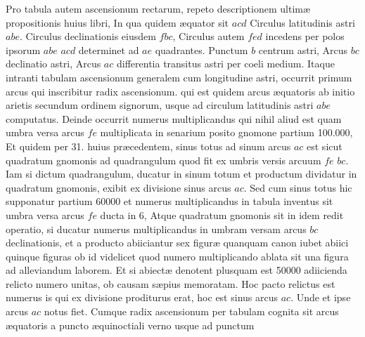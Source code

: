 \documentclass[11pt,a4paper]{article}
\begin{document}
Pro tabula autem ascensionum rectarum, repeto descriptionem
ultimæ propositionis huius libri, In qua quidem æquator sit $acd$
Circulus latitudinis astri $abe$. Circulus declinationis eiusdem
$fbc$, Circulus autem $fed$ incedens per polos ipsorum $abe$ $acd$
determinet ad $ae$ quadrantes. Punctum $b$ centrum astri,
Arcus $bc$ declinatio astri, Arcus $ac$ differentia transitus astri per
coeli medium. Itaque intranti tabulam ascensionum generalem
cum longitudine astri, occurrit primum arcus qui inscribitur
radix ascensionum. qui est quidem arcus æquatoris ab initio
arietis secundum ordinem signorum, usque ad circulum
latitudinis astri $abe$ computatus. Deinde occurrit numerus
multiplicandus qui nihil aliud est quam umbra versa
arcus $fe$ multiplicata in senarium posito gnomone partium
100.000, Et quidem per 31. huius præcedentem, sinus totus ad
sinum arcus $ac$ est sicut quadratum gnomonis ad quadrangulum
quod fit ex umbris versis arcuum $fe$ $bc$. Iam si dictum quadrangulum,
ducatur in sinum totum et productum dividatur
in quadratum gnomonis, exibit ex divisione sinus arcus $ac$.
Sed cum sinus totus hic supponatur partium 60000 et numerus
multiplicandus in tabula inventus sit umbra versa arcus $fe$ ducta
in 6, Atque quadratum gnomonis sit  in idem
redit operatio, si ducatur numerus multiplicandus in umbram
versam arcus $bc$ declinationis, et a producto abiiciantur sex
figuræ quanquam canon iubet abiici quinque figuras ob id
videlicet quod numero multiplicando ablata sit una figura
ad alleviandum laborem. Et si abiectæ denotent plusquam
est 50000 adiicienda relicto numero unitas, ob causam sæpius
memoratam. Hoc pacto relictus est numerus is qui ex divisione
proditurus erat, hoc est sinus arcus $ac$. Unde et ipse arcus
$ac$ notus fiet. Cumque radix ascensionum per tabulam cognita
sit arcus æquatoris a puncto æquinoctiali verno usque ad punctum
\end{document}
